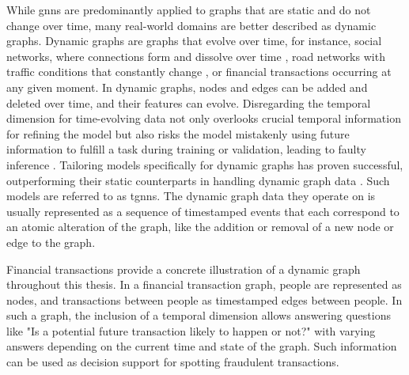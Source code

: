 While \glspl{gnn} are predominantly applied to graphs that are static and do not change over time, many real-world domains are better described as dynamic graphs. Dynamic graphs are graphs that evolve over time, for instance, social networks, where connections form and dissolve over time \cite{rossi_temporal_2020, souza_provably_2022}, road networks with traffic conditions that constantly change \cite{zhao_t-gcn_2020}, or financial transactions occurring at any given moment. In dynamic graphs, nodes and edges can be added and deleted over time, and their features can evolve. Disregarding the temporal dimension for time-evolving data not only overlooks crucial temporal information for refining the model \cite{xu_inductive_2020} but also risks the model mistakenly using future information to fulfill a task during training or validation, leading to faulty inference \cite{xu_inductive_2020}. Tailoring models specifically for dynamic graphs has proven successful, outperforming their static counterparts in handling dynamic graph data \cite{ma_streaming_2018, makarov_temporal_2021, rossi_temporal_2020, trivedi_dyrep_2019, xu_inductive_2020, souza_provably_2022}. Such models are referred to as \glspl{tgnn}. The dynamic graph data they operate on is usually represented as a sequence of timestamped events that each correspond to an atomic alteration of the graph, like the addition or removal of a new node or edge to the graph.

Financial transactions provide a concrete illustration of a dynamic graph throughout this thesis. In a financial transaction graph, people are represented as nodes, and transactions between people as timestamped edges between people. In such a graph, the inclusion of a temporal dimension allows answering questions like "Is a potential future transaction likely to happen or not?" with varying answers depending on the current time and state of the graph. Such information can be used as decision support for spotting fraudulent transactions.

